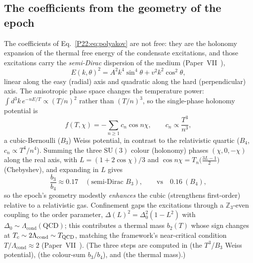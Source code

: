 \documentclass[11pt,a4paper]{article}
\theoremstyle{definition}\newtheorem{definition}[theorem]{Definition}
\newcommand{\Lcond}{\Lambda_{\mathrm{cond}}}
\newcommand{\SU}{\mathrm{SU}}
\newcommand{\Zthree}{\mathbb{Z}_3}
\begin{document}
\subsection{The coefficients from the geometry of the epoch}
\label{P22:subsec:coeffs}
The coefficients of Eq.~\eqref{P22:eq:polyakov} are not free: they are the holonomy expansion of
the thermal free energy of the condensate excitations, and those excitations carry the
\emph{semi-Dirac} dispersion of the medium (Paper~VII~\cite{Paper7}),
\begin{equation}
  E(k,\theta)^2=A^2k^4\sin^4\theta+v^2k^2\cos^2\theta ,
  \label{P22:eq:semidirac}
\end{equation}
linear along the easy (radial) axis and quadratic along the hard (perpendicular) axis. The
anisotropic phase space changes the temperature power: $\int\!d^3k\,e^{-nE/T}\propto(T/n)^{2}$
rather than $(T/n)^3$, so the single-phase holonomy potential is
\begin{equation}
  f(T,\chi)=-\sum_{n\ge1}c_n\cos n\chi,\qquad c_n\propto\frac{T^3}{n^{3}} ,
  \label{P22:eq:weiss}
\end{equation}
a cubic-Bernoulli ($B_3$) Weiss potential, in contrast to the relativistic quartic ($B_4$,
$c_n\propto T^4/n^4$). Summing the three $\SU(3)$ colour (holonomy) phases $(\chi,0,-\chi)$ along
the real axis, with $L=(1+2\cos\chi)/3$ and $\cos n\chi=T_n\!\big(\tfrac{3L-1}{2}\big)$ (Chebyshev), and
expanding in $L$ gives
\begin{equation}
  \frac{b_3}{b_4}\approx0.17 \quad(\text{semi-Dirac }B_3),\qquad\text{vs}\quad 0.16\ (B_4),
  \label{P22:eq:b3b4}
\end{equation}
so the epoch's geometry modestly \emph{enhances} the cubic (strengthens first-order) relative
to a relativistic gas. Confinement gaps the excitations through a $\Zthree$-even coupling to
the order parameter, $\Delta(L)^2=\Delta_0^2(1-L^2)$ with $\Delta_0\sim\Lcond(\mathrm{QCD})$;
this contributes a thermal mass $b_2(T)$ whose sign changes at $T_c\sim2\Lcond\sim T_{\rm QCD}$,
matching the framework's near-critical condition $T/\Lcond\approx2$ (Paper~VII~\cite{Paper7}).
(The three steps are computed in  (the $T^3$/$B_3$ Weiss potential),
 (the colour-sum $b_3/b_4$), and  (the thermal
mass).)
\end{document}
